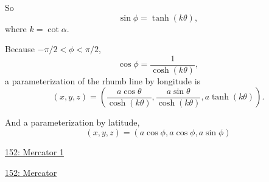 \documentclass{ximera}
\begin{document}
So
\[
   \sin\phi = \operatorname{tanh}(k \theta),
\]
where $k=\cot\alpha$.

Because $-\pi/2 < \phi < \pi/2$,
\[
  \cos\phi =  \frac{1}{\cosh (k \theta)},
\]
a parameterization of the rhumb line by longitude is
\[
  (x,y,z) = \left( \frac{a\cos\theta}{\cosh(k\theta)} , \frac{a\sin\theta}{\cosh(k\theta)}  , a \tanh(k\theta)  \right) .
\]


And a parameterization by latitude,
\[
   (x,y,z) = \left(  a    \cos\phi  ,   a    \cos\phi    ,   a \sin \phi   \right)
\]

\begin{onlineOnly}
    \begin{center}
\end{center}
\end{onlineOnly}

\href{https://www.desmos.com/3d/6cqnjsuew7}{152: Mercator 1}


\begin{onlineOnly}
    \begin{center}
\end{center}
\end{onlineOnly}

\begin{onlineOnly}
    \begin{center}
\end{center}
\end{onlineOnly}

\href{https://www.geogebra.org/classic/mvp9zvge}{152: Mercator}
\end{document}
